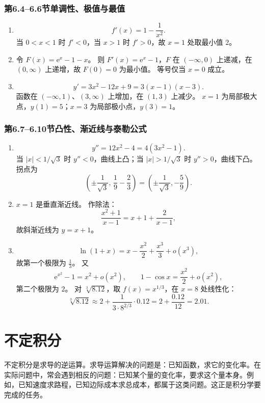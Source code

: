 \documentclass[fontset=fandol]{ctexart}
\newcommand{\ee}{\mathrm{e}}
\begin{document}
\subsubsection*{第6.4--6.6节\quad 单调性、极值与最值}

\begin{enumerate}[label=\textbf{练习\arabic*.},leftmargin=2.2em]
\item
\[
f'(x)=1-\frac1{x^2}.
\]
当 $0<x<1$ 时 $f'<0$，当 $x>1$ 时 $f'>0$，故 $x=1$ 处取最小值 $2$。
\item 令 $F(x)=\ee^x-1-x$。 则 $F'(x)=\ee^x-1$，$F$ 在 $(-\infty,0)$ 上递减，在 $(0,\infty)$ 上递增，故 $F(0)=0$ 为最小值。 等号仅当 $x=0$ 成立。
\item
\[
y'=3x^2-12x+9=3(x-1)(x-3).
\]
函数在 $(-\infty,1)$、$(3,\infty)$ 上增加，在 $(1,3)$ 上减少。 $x=1$ 为局部极大点，$y(1)=5$；$x=3$ 为局部极小点，$y(3)=1$。
\end{enumerate}

\subsubsection*{第6.7--6.10节\quad 凸性、渐近线与泰勒公式}

\begin{enumerate}[label=\textbf{练习\arabic*.},leftmargin=2.2em]
\item
\[
y''=12x^2-4=4(3x^2-1).
\]
当 $|x|<1/\sqrt3$ 时 $y''<0$，曲线上凸；当 $|x|>1/\sqrt3$ 时 $y''>0$，曲线下凸。 拐点为
\[
\left(\pm\frac1{\sqrt3},\,\frac19-\frac23\right)=\left(\pm\frac1{\sqrt3},-\frac59\right).
\]
\item $x=1$ 是垂直渐近线。 作除法：
\[
\frac{x^2+1}{x-1}=x+1+\frac2{x-1},
\]
故斜渐近线为 $y=x+1$。
\item
\[
\ln(1+x)=x-\frac{x^2}{2}+\frac{x^3}{3}+o(x^3),
\]
故第一个极限为 $\frac13$。 又
\[
\ee^{x^2}-1=x^2+o(x^2),\qquad 1-\cos x=\frac{x^2}{2}+o(x^2),
\]
第二个极限为 $2$。 对 $\sqrt[3]{8.12}$，取 $f(x)=x^{1/3}$，在 $x=8$ 处线性化：
\[
\sqrt[3]{8.12}\approx2+\frac{1}{3\cdot 8^{2/3}}\cdot0.12=2+\frac{0.12}{12}=2.01.
\]
\end{enumerate}

\fi


\clearpage
\section{不定积分}

不定积分是求导的逆运算。求导运算解决的问题是：已知函数，求它的变化率。在实际问题中，常会遇到相反的问题：已知某个量的变化率，要求这个量本身。例如，已知速度求路程，已知边际成本求总成本，都属于这类问题。这正是积分学要完成的任务。
\end{document}
